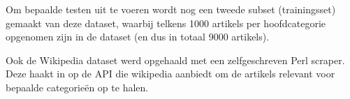 Om bepaalde testen uit te voeren wordt nog een tweede subset (trainingsset) gemaakt van deze dataset, waarbij telkens 1000 artikels per hoofdcategorie opgenomen zijn in de dataset (en dus in totaal 9000 artikels).

Ook de Wikipedia dataset werd opgehaald met een zelfgeschreven Perl scraper. Deze haakt in op de API die wikipedia aanbiedt om de artikels relevant voor bepaalde categorie\"en op te halen. 